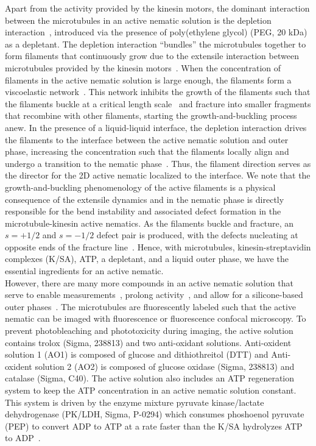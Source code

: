 Apart from the activity provided by the kinesin motors, the dominant interaction between the microtubules in an active nematic solution is the depletion interaction~\cite{RN251}, introduced via the presence of poly(ethylene glycol) (PEG, 20 kDa) as a depletant.
The depletion interaction ``bundles'' the microtubules together to form filaments that continuously grow due to the extensile interaction between microtubules provided by the kinesin motors~\cite{RN244,RN4,RN3}.
When the concentration of filaments in the active nematic solution is large enough, the filaments form a viscoelastic network~\cite{RN253,RN3}.
This network inhibits the growth of the filaments such that the filaments buckle at a critical length scale~\cite{RN253,RN3} and fracture into smaller fragments that recombine with other filaments, starting the growth-and-buckling process anew.
In the presence of a liquid-liquid interface, the depletion interaction drives the filaments to the interface between the active nematic solution and outer phase, increasing the concentration such that the filaments locally align and undergo a transition to the nematic phase~\cite{RN3,RN135,RN134}.
Thus, the filament direction serves as the director for the 2D active nematic localized to the interface.
We note that the growth-and-buckling phenomenology of the active filaments is a physical consequence of the extensile dynamics and in the nematic phase is directly responsible for the bend instability and associated defect formation in the  microtubule-kinesin active nematics.
As the filaments buckle and fracture, an $s = +1/2$ and $s = -1/2$ defect pair is produced, with the defects nucleating at opposite ends of the fracture line~\cite{RN3,RN11}.
Hence, with microtubules, kinesin-streptavidin complexes (K/SA), ATP, a depletant, and a liquid outer phase, we have the essential ingredients for an active nematic.\\

However, there are many more compounds in an active nematic solution that serve to enable measurements~\cite{RN3,RN135}, prolong activity~\cite{RN3,RN135}, and allow for a silicone-based outer phases~\cite{RN135}.
The microtubules are fluorescently labeled such that the active nematic can be imaged with fluorescence or fluorescence confocal microscopy.
To prevent photobleaching and phototoxicity during imaging, the active solution contains trolox (Sigma, 238813) and two anti-oxidant solutions.
Anti-oxident solution 1 (AO1) is composed of glucose and dithiothreitol (DTT) and Anti-oxident solution 2 (AO2) is composed of glucose oxidase (Sigma, 238813) and catalase (Sigma, C40).
The active solution also includes an ATP regeneration system to keep the ATP concentration in an active nematic solution constant.
This system is driven by the enzyme mixture pyruvate kinase/lactate dehydrogenase (PK/LDH, Sigma, P-0294) which consumes phoshoenol pyruvate (PEP) to convert ADP to ATP at a rate faster than the K/SA hydrolyzes ATP to ADP~\cite{RN246}. \\

